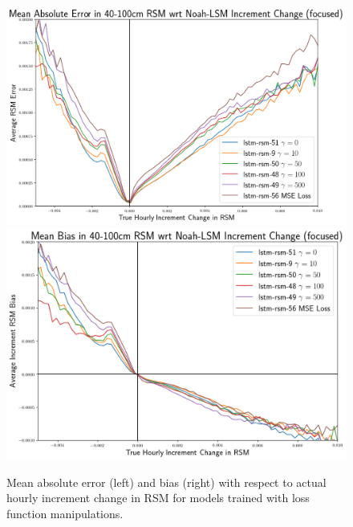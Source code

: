 \begin{figure}[hp!]
    \includegraphics[width=.48\linewidth,draft=false]{figures/error-wrt-increment-change/eval_test_rsm-100_increment-error-1d-focus_abs-err.png}
    \includegraphics[width=.48\linewidth,draft=false]{figures/error-wrt-increment-change/eval_test_rsm-100_increment-error-1d-focus_bias.png}

    \caption{Mean absolute error (left) and bias (right) with respect to actual hourly increment change in RSM for models trained with loss function manipulations.}
    \label{bars-loss-fn-manipulations}
\end{figure}


